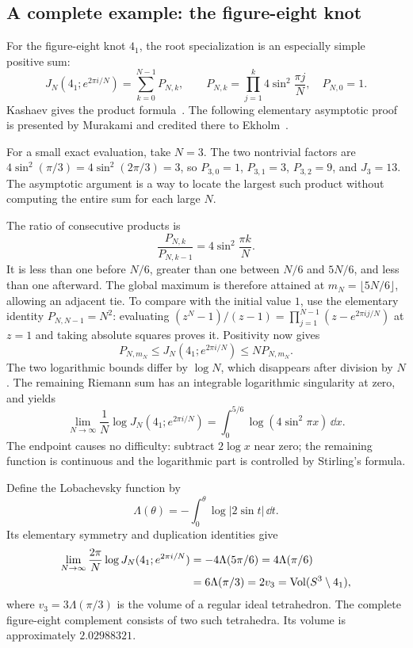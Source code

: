 \subsection{A complete example: the figure-eight knot}
\label{sec:introfigureeight}

For the figure-eight knot $4_1$, the root specialization is an
especially simple positive sum:
\begin{equation}
 \boxed{\quad
 J_N(4_1;e^{2\pi i/N})=\sum_{k=0}^{N-1}P_{N,k},\qquad
 P_{N,k}=\prod_{j=1}^{k}4\sin^2\frac{\pi j}{N},\quad P_{N,0}=1.
 \quad}
 \label{eq:introfigureproduct}
\end{equation}
Kashaev gives the product formula~\cite[eqs. (2.2), (2.5)]{KashaevVolume}.
The following elementary asymptotic proof is presented by
Murakami and credited there to Ekholm~\cite[Section 3.2]{MurakamiIntro}.

For a small exact evaluation, take $N=3$. The two nontrivial
factors are $4\sin^2(\pi/3)=4\sin^2(2\pi/3)=3$,
so $P_{3,0}=1$, $P_{3,1}=3$, $P_{3,2}=9$, and $J_3=13$.
The asymptotic argument is a way to locate the largest such product
without computing the entire sum for each large $N$.

The ratio of consecutive products is
\[
 \frac{P_{N,k}}{P_{N,k-1}}=4\sin^2\frac{\pi k}{N}.
\]
It is less than one before $N/6$, greater than one between $N/6$
and $5N/6$, and less than one afterward. The global maximum is
therefore attained at $m_N=\lfloor5N/6\rfloor$, allowing an adjacent
tie. To compare with the initial value $1$, use the elementary
identity $P_{N,N-1}=N^2$: evaluating
$(z^N-1)/(z-1)=\prod_{j=1}^{N-1}(z-e^{2\pi i j/N})$ at $z=1$
and taking absolute squares proves it. Positivity now gives
\[
 P_{N,m_N}\le J_N(4_1;e^{2\pi i/N})\le N P_{N,m_N}.
\]
The two logarithmic bounds differ by $\log N$, which disappears
after division by $N$. The remaining Riemann sum has an integrable
logarithmic singularity at zero, and yields
\begin{equation}
 \lim_{N\to\infty}\frac1N\log J_N(4_1;e^{2\pi i/N})
 =\int_0^{5/6}\log(4\sin^2\pi x)\,\dd x.
 \label{eq:introfigureintegral}
\end{equation}
The endpoint causes no difficulty: subtract $2\log x$ near zero;
the remaining function is continuous and the logarithmic part is
controlled by Stirling's formula.

Define the Lobachevsky function by
\[
 \Lambda(\theta)=-\int_0^\theta\log|2\sin t|\,\dd t.
\]
Its elementary symmetry and duplication identities give
\begin{align}
 \lim_{N\to\infty}\frac{2\pi}{N}
       \log J_N(4_1;e^{2\pi i/N})
 &=-4\Lambda(5\pi/6)=4\Lambda(\pi/6)\notag\\
 &=6\Lambda(\pi/3)=2v_3
  =\operatorname{Vol}(S^3\setminus4_1),
 \label{eq:introfigurevolume}
\end{align}
where $v_3=3\Lambda(\pi/3)$ is the volume of a regular ideal
tetrahedron. The complete figure-eight complement consists of two
such tetrahedra. Its volume is approximately $2.02988321$.

